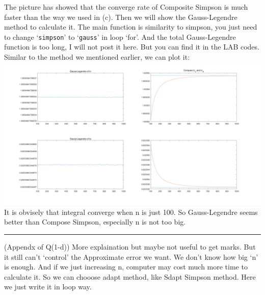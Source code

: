 \documentclass{article}
\begin{document}
\begin{flushleft}
\begin{enumerate}
\begin{framed}
\newpage
The picture has showed that the converge rate of Composite Simpson is much faster than the way we
\newline
used in (c).
\newline
Then we will show the Gauss-Legendre method to calculate it. The main function is similarity to simpson, you just need to change `\verb|simpson|' to `\verb|gauss|' in loop `for'.
And the total Gauss-Legendre function is too long, I will not post it here. But you can find it in the LAB codes.
Similar to the method we mentioned earlier, we can plot it:
\includegraphics[width={\linewidth}]{Q1_d_GS.png}
It is obvisely that integral converge when n is just 100. So Gauss-Legendre seems better than Compose Simpson, especially n is not too big.
\newpage
\rule[-0.7mm]{45em}{0.1pt}
(Appendx of Q(1-d)) More explaination but maybe not useful to get marks.
\newline
But it still can't `control' the Approximate error we want. We don't know how big `n' is enough.
And if we just increasing n, computer may cost much more time to calculate it.
So we can chooose adapt method, like Sdapt Simpson method.
Here we just write it in loop way.


\end{framed}
\end{enumerate}
\end{flushleft}
\end{document}
